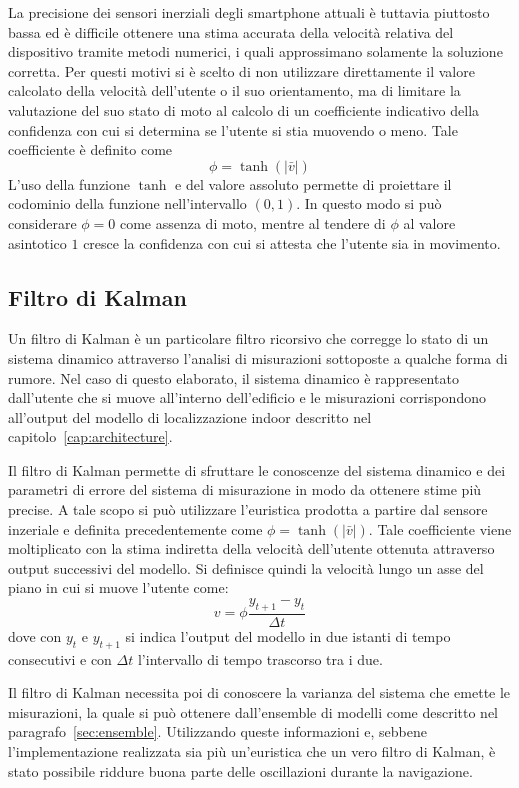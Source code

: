 La precisione dei sensori inerziali degli smartphone attuali è tuttavia
piuttosto bassa ed è difficile ottenere una stima accurata della velocità
relativa del dispositivo tramite metodi numerici, i quali approssimano
solamente la soluzione corretta. Per questi motivi si è scelto di non
utilizzare direttamente il valore calcolato della velocità dell'utente o il suo
orientamento, ma di limitare la valutazione del suo stato di moto al calcolo di
un coefficiente indicativo della confidenza con cui si determina se l'utente si
stia muovendo o meno. Tale coefficiente è definito come
\[ \phi = \tanh(|\bar{v}|) \]
L'uso della funzione \(\tanh\) e del valore assoluto permette di proiettare il
codominio della funzione nell'intervallo \( (0,1) \). In questo modo
si può considerare \(\phi = 0\) come assenza di moto, mentre al tendere di
\(\phi\) al valore asintotico \(1\) cresce la confidenza con cui si attesta
che l'utente sia in movimento.

\subsection{Filtro di Kalman}\label{sec:kalman}
Un filtro di Kalman è un particolare filtro ricorsivo che corregge lo stato di
un sistema dinamico attraverso l'analisi di misurazioni sottoposte a qualche
forma di rumore. Nel caso di questo elaborato, il sistema dinamico è
rappresentato dall'utente che si muove all'interno dell'edificio e le
misurazioni corrispondono all'output del modello di localizzazione indoor
descritto nel capitolo~\ref{cap:architecture}.

Il filtro di Kalman permette di sfruttare le conoscenze del sistema dinamico e
dei parametri di errore del sistema di misurazione in modo da ottenere stime
più precise. A tale scopo si può utilizzare l'euristica prodotta a partire dal
sensore inzeriale e definita precedentemente come \(\phi = \tanh(|\bar{v}|)\).
Tale coefficiente viene moltiplicato con la stima indiretta della velocità
dell'utente ottenuta attraverso output successivi del modello. Si definisce
quindi la velocità lungo un asse del piano in cui si muove l'utente come:
\[ v = \phi \frac{y_{t+1} - y_t}{\Delta t} \]
dove con \(y_t\) e \(y_{t+1}\) si indica l'output del modello in due istanti di
tempo consecutivi e con \(\Delta t\) l'intervallo di tempo trascorso tra i due.

Il filtro di Kalman necessita poi di conoscere la varianza del sistema che
emette le misurazioni, la quale si può ottenere dall'ensemble di modelli come
descritto nel paragrafo~\ref{sec:ensemble}. Utilizzando queste informazioni e,
sebbene l'implementazione realizzata sia più un'euristica che un vero filtro di
Kalman, è stato possibile riddure buona parte delle oscillazioni durante la
navigazione.




